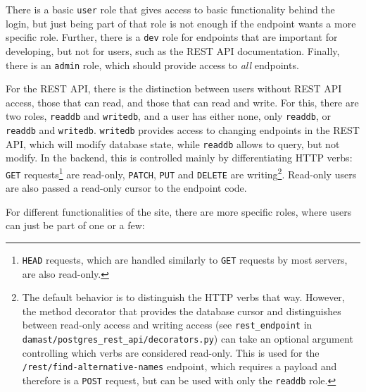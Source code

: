 There is a basic \verb!user! role that gives access to basic functionality behind the login, but just being part of that role is not enough if the endpoint wants a more specific role.
Further, there is a \verb!dev! role for endpoints that are important for developing, but not for users, such as the REST API documentation.
Finally, there is an \verb!admin! role, which should provide access to \emph{all} endpoints.

For the REST API, there is the distinction between users without REST API access, those that can read, and those that can read and write.
For this, there are two roles, \verb!readdb! and \verb!writedb!, and a user has either none, only \verb!readdb!, or \verb!readdb! and \verb!writedb!.
\verb!writedb! provides access to changing endpoints in the REST API, which will modify database state, while \verb!readdb!  allows to query, but not modify.
In the backend, this is controlled mainly by differentiating HTTP verbs: \verb!GET! requests\footnote{%
  \texttt{HEAD} requests, which are handled similarly to \texttt{GET} requests by most servers, are also read-only.
} are read-only, \verb!PATCH!, \verb!PUT! and \verb!DELETE! are writing\footnote{%
  The default behavior is to distinguish the HTTP verbs that way.
  However, the method decorator that provides the database cursor and distinguishes between read-only access and writing access (see \texttt{rest\_endpoint} in \texttt{damast/postgres\_rest\_api/decorators.py}) can take an optional argument controlling which verbs are considered read-only.
  This is used for the \texttt{/rest/find-alternative-names} endpoint, which requires a payload and therefore is a \texttt{POST} request, but can be used with only the \texttt{readdb} role.
}.
Read-only users are also passed a read-only cursor to the endpoint code.

For different functionalities of the site, there are more specific roles, where users can just be part of one or a few:

